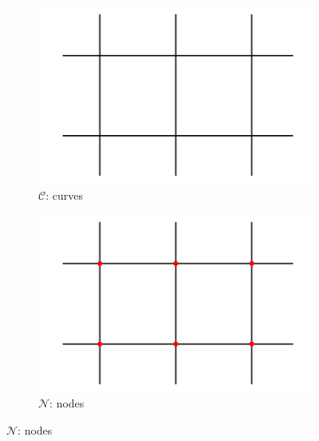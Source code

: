 \begin{figure}%
  \centering
  \begin{subfigure}{.4\textwidth}
    \includegraphics[width=\textwidth]{figures/subd_simpleExample_a.png}
    \caption{$\mathcal{C}$: curves} \label{subfig:subd_simpleExample_a}
  \end{subfigure}%
  \quad \quad%
  \begin{subfigure}{.4\textwidth}
    \includegraphics[width=\textwidth]{figures/subd_simpleExample_b.png}
    \caption{$\mathcal{N}$: nodes} \label{subfig:subd_simpleExample_b}
  \end{subfigure}


\end{figure}

